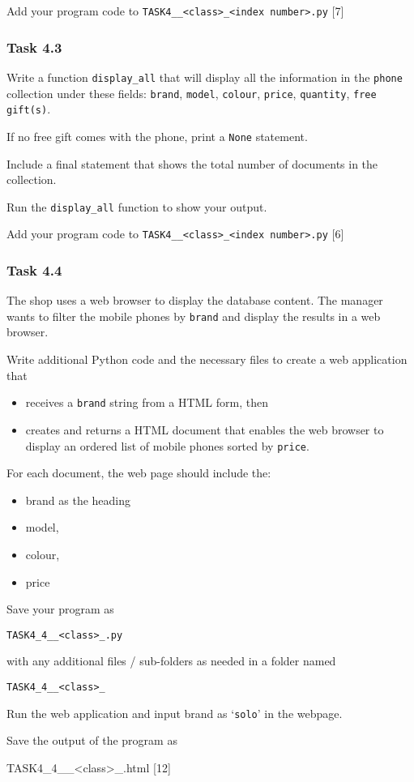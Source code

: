 Add your program code to \texttt{TASK4\_<your name>\_<class>\_<index
number>.py} \hfill{}{[}7{]}

\subsubsection*{Task 4.3 }

Write a function \texttt{display\_all} that will display all the information
in the \texttt{phone} collection under these fields: \texttt{brand},
\texttt{model}, \texttt{colour}, \texttt{price}, \texttt{quantity},
\texttt{free gift(s)}. 

If no free gift comes with the phone, print a \texttt{None} statement.

Include a final statement that shows the total number of documents
in the collection. 

Run the \texttt{display\_all} function to show your output. 

Add your program code to \texttt{TASK4\_<your name>\_<class>\_<index
number>.py} \hfill{}{[}6{]}

\subsubsection*{Task 4.4}

The shop uses a web browser to display the database content. The manager
wants to filter the mobile phones by \texttt{brand} and display the
results in a web browser. 

Write additional Python code and the necessary files to create a web
application that 
\begin{itemize}
\item receives a \texttt{brand} string from a HTML form, then 
\item creates and returns a HTML document that enables the web browser to
display an ordered list of mobile phones sorted by \texttt{price}. 
\end{itemize}
For each document, the web page should include the: 
\begin{itemize}
\item brand as the heading 
\item model, 
\item colour, 
\item price 
\end{itemize}
Save your program as 

\texttt{TASK4\_4\_<your name>\_<class>\_<index number>.py} 

with any additional files / sub-folders as needed in a folder named 

\texttt{TASK4\_4\_<your name>\_<class>\_<index number>} 

Run the web application and input brand as \textquoteleft \texttt{solo}\textquoteright{}
in the webpage.

Save the output of the program as 

TASK4\_4\_<your name>\_<class>\_<index number>.html\hfill{} {[}12{]}